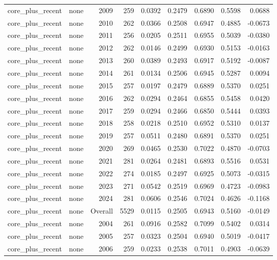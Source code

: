 \begin{table}[t]
\begin{tabular}{@{} l l r r r r r r r @{} }
      core\_plus\_recent & none & 2009 & 259 & 0.0392 & 0.2479 & 0.6890 & 0.5598 & 0.0688 \\
      core\_plus\_recent & none & 2010 & 262 & 0.0366 & 0.2508 & 0.6947 & 0.4885 & -0.0673 \\
      core\_plus\_recent & none & 2011 & 256 & 0.0205 & 0.2511 & 0.6955 & 0.5039 & -0.0380 \\
      core\_plus\_recent & none & 2012 & 262 & 0.0146 & 0.2499 & 0.6930 & 0.5153 & -0.0163 \\
      core\_plus\_recent & none & 2013 & 260 & 0.0389 & 0.2493 & 0.6917 & 0.5192 & -0.0087 \\
      core\_plus\_recent & none & 2014 & 261 & 0.0134 & 0.2506 & 0.6945 & 0.5287 & 0.0094 \\
      core\_plus\_recent & none & 2015 & 257 & 0.0197 & 0.2479 & 0.6889 & 0.5370 & 0.0251 \\
      core\_plus\_recent & none & 2016 & 262 & 0.0294 & 0.2464 & 0.6855 & 0.5458 & 0.0420 \\
      core\_plus\_recent & none & 2017 & 259 & 0.0294 & 0.2466 & 0.6850 & 0.5444 & 0.0393 \\
      core\_plus\_recent & none & 2018 & 258 & 0.0218 & 0.2510 & 0.6952 & 0.5310 & 0.0137 \\
      core\_plus\_recent & none & 2019 & 257 & 0.0511 & 0.2480 & 0.6891 & 0.5370 & 0.0251 \\
      core\_plus\_recent & none & 2020 & 269 & 0.0465 & 0.2530 & 0.7022 & 0.4870 & -0.0703 \\
      core\_plus\_recent & none & 2021 & 281 & 0.0264 & 0.2481 & 0.6893 & 0.5516 & 0.0531 \\
      core\_plus\_recent & none & 2022 & 274 & 0.0185 & 0.2497 & 0.6925 & 0.5073 & -0.0315 \\
      core\_plus\_recent & none & 2023 & 271 & 0.0542 & 0.2519 & 0.6969 & 0.4723 & -0.0983 \\
      core\_plus\_recent & none & 2024 & 281 & 0.0606 & 0.2546 & 0.7024 & 0.4626 & -0.1168 \\
      core\_plus\_recent & none & Overall & 5529 & 0.0115 & 0.2505 & 0.6943 & 0.5160 & -0.0149 \\
      core\_plus\_recent & none & 2004 & 261 & 0.0916 & 0.2582 & 0.7099 & 0.5402 & 0.0314 \\
      core\_plus\_recent & none & 2005 & 257 & 0.0323 & 0.2504 & 0.6940 & 0.5019 & -0.0417 \\
      core\_plus\_recent & none & 2006 & 259 & 0.0233 & 0.2538 & 0.7011 & 0.4903 & -0.0639 \\

\end{tabular}
\end{table}
